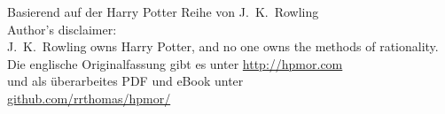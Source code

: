 \begin{center}
{\vspace*{1\baselineskip}
Basierend auf der Harry Potter Reihe von J.~K.~Rowling\\
}
\vfill
{
\vspace*{1\baselineskip}
Author's disclaimer:\\J.~K.~Rowling owns Harry Potter, and no one owns the methods of rationality.
\\\vspace*{1\baselineskip}
Die englische Originalfassung gibt es unter {\small\href{http://hpmor.com}{http://hpmor.com}}\\
und als überarbeites PDF und eBook unter\\
{\small\href{https://github.com/rrthomas/hpmor/}{github.com/rrthomas/hpmor/}}\\
}
\end{center}


